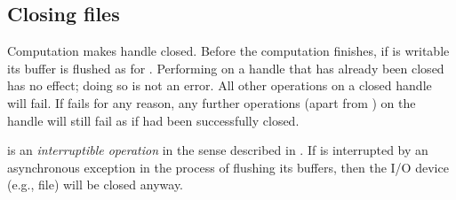 \subsection{Closing files}
\begin{haddockdesc}
\item[\begin{tabular}{@{}l}
hClose :: Handle -> IO ()
\end{tabular}]
{\haddockbegindoc
Computation   makes handle  closed.  Before the
 computation finishes, if  is writable its buffer is flushed as
 for .
 Performing  on a handle that has already been closed has no effect;
 doing so is not an error.  All other operations on a closed handle will fail.
 If  fails for any reason, any further operations (apart from
 ) on the handle will still fail as if  had been successfully
 closed.\par
{} is an \emph{interruptible operation} in the sense described in
 . If  is interrupted by an asynchronous
 exception in the process of flushing its buffers, then the I/O device
 (e.g., file) will be closed anyway.\par}
\end{haddockdesc}
